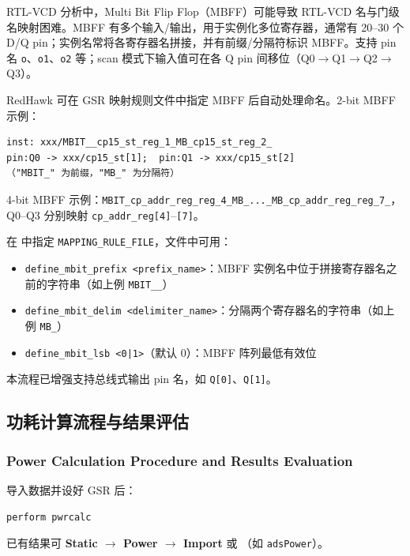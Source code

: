 RTL-VCD 分析中，Multi Bit Flip Flop（MBFF）可能导致 RTL-VCD 名与门级名映射困难。MBFF 有多个输入/输出，用于实例化多位寄存器，通常有 20--30 个 D/Q pin；实例名常将各寄存器名拼接，并有前缀/分隔符标识 MBFF。支持 pin 名 \texttt{o}、\texttt{o1}、\texttt{o2} 等；scan 模式下输入值可在各 Q pin 间移位（Q0$\rightarrow$Q1$\rightarrow$Q2$\rightarrow$Q3）。

RedHawk 可在 GSR 映射规则文件中指定 MBFF 后自动处理命名。2-bit MBFF 示例：
\begin{verbatim}
inst: xxx/MBIT__cp15_st_reg_1_MB_cp15_st_reg_2_
pin:Q0 -> xxx/cp15_st[1];  pin:Q1 -> xxx/cp15_st[2]
（"MBIT_" 为前缀，"MB_" 为分隔符）
\end{verbatim}

4-bit MBFF 示例：\texttt{MBIT\_cp\_addr\_reg\_reg\_4\_MB\_...\_MB\_cp\_addr\_reg\_reg\_7\_}，Q0--Q3 分别映射 \texttt{cp\_addr\_reg[4]}--\texttt{[7]}。

在  中指定 \texttt{MAPPING\_RULE\_FILE}，文件中可用：
\begin{itemize}
  \item \texttt{define\_mbit\_prefix <prefix\_name>}：MBFF 实例名中位于拼接寄存器名之前的字符串（如上例 \texttt{MBIT\_\_}）
  \item \texttt{define\_mbit\_delim <delimiter\_name>}：分隔两个寄存器名的字符串（如上例 \texttt{MB\_}）
  \item \texttt{define\_mbit\_lsb <0|1>}（默认 0）：MBFF 阵列最低有效位
\end{itemize}

本流程已增强支持总线式输出 pin 名，如 \texttt{Q[0]}、\texttt{Q[1]}。

\subsection{功耗计算流程与结果评估}
\subsubsection*{Power Calculation Procedure and Results Evaluation}

导入数据并设好 GSR 后：
\begin{lstlisting}
perform pwrcalc
\end{lstlisting}

已有结果可 \textbf{Static $\rightarrow$ Power $\rightarrow$ Import} 或 （如 \texttt{adsPower}）。


